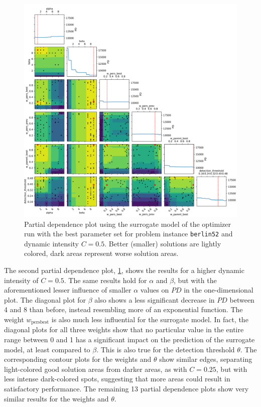 \begin{figure}[h!]
	\centering
	\centerline{\includegraphics[width=1.2\textwidth]{results/part2/partial_dependence_berlin52_C_0.5_run_4.svg}}
	\caption[Partial dependence plot for \texttt{berlin52} and $C=0.5$]{Partial dependence plot using the surrogate model of the optimizer run with the best parameter set for problem instance \texttt{berlin52} and dynamic intensity $C=0.5$. Better (smaller) solutions are lightly colored, dark areas represent worse solution areas.}
	\label{fig:partial_dependence_berlin52_C_05}
\end{figure}

The second partial dependence plot, \cref{fig:partial_dependence_berlin52_C_05}, shows the results for a higher dynamic intensity of $C=0.5$. 
The same results hold for $\alpha$ and $\beta$, but with the aforementioned lesser influence of smaller $\alpha$ values on $PD$ in the one-dimensional plot. The diagonal plot for $\beta$ also shows a less significant decrease in $PD$ between 4 and 8 than before, instead resembling more of an exponential function. The weight $w_{\text{persbest}}$ is also much less influential for the surrogate model. In fact, the diagonal plots for all three weights show that no particular value in the entire range between 0 and 1 has a significant impact on the prediction of the surrogate model, at least compared to $\beta$. This is also true for the detection threshold $\theta$. The corresponding contour plots for the weights and $\theta$ show similar edges, separating light-colored good solution areas from darker areas, as with $C=0.25$, but with less intense dark-colored spots, suggesting that more areas could result in satisfactory performance. The remaining 13 partial dependence plots show very similar results for the weights and $\theta$.

